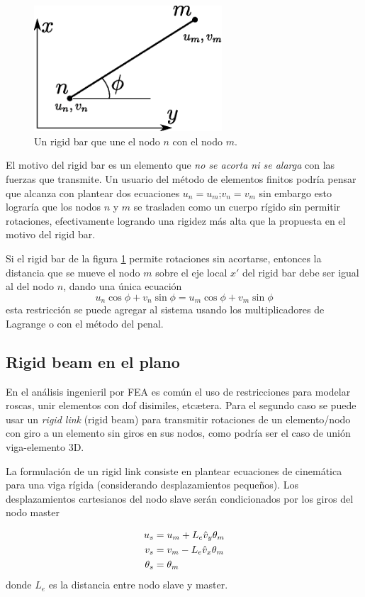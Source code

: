 \begin{figure}[htb!]
	\centering
	\includegraphics[width=7cm]{fig/rigidbarschematic.eps}
	\caption{Un rigid bar que une el nodo $n$ con el nodo $m$.}
	\label{fig:rigidbarschematic}
\end{figure}

El motivo del rigid bar es un elemento que \textit{no se acorta ni se alarga} con las fuerzas que transmite. Un usuario del método de elementos finitos podría pensar que alcanza con plantear dos ecuaciones $u_n=u_m$;$v_n=v_m$ sin embargo esto lograría que los nodos $n$ y $m$ se trasladen como un cuerpo rígido sin permitir rotaciones, efectivamente logrando una rigidez más alta que la propuesta en el motivo del rigid bar.

Si el rigid bar de la figura \ref{fig:rigidbarschematic} permite rotaciones sin acortarse, entonces la distancia que se mueve el nodo $m$ sobre el eje local $x'$ del rigid bar debe ser igual al del nodo $n$, dando una única ecuación
\[
u_n\cos\phi + v_n \sin\phi = u_m\cos\phi +v_m\sin\phi  
\]
esta restricción se puede agregar al sistema usando los multiplicadores de Lagrange o con el método del penal.


\subsection*{Rigid beam en el plano}
En el análisis ingenieril por FEA es común el uso de restricciones para modelar roscas, unir elementos con dof disimiles, etcætera. Para el segundo caso se puede usar un \textit{rigid link} (rigid beam) para transmitir rotaciones de un elemento/nodo con giro a un elemento sin giros en sus nodos, como podría ser el caso de unión viga-elemento 3D.

La formulación de un rigid link consiste en plantear ecuaciones de cinemática para una viga rígida (considerando desplazamientos pequeños). Los desplazamientos cartesianos del nodo slave serán condicionados por los giros del nodo master

\begin{align*}
	u_s &= u_m  + L_e \hat{v}_y\theta_m \\
	v_s &= v_m  - L_e \hat{v}_x \theta_m \\
	\theta_s &= \theta_m
\end{align*}
donde $L_e$ es la distancia entre nodo slave y master.

